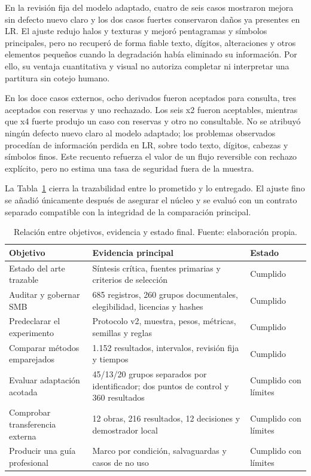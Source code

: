 En la revisión fija del modelo adaptado, cuatro de seis casos mostraron mejora sin defecto nuevo
claro y los dos casos fuertes conservaron daños ya presentes en LR. El ajuste redujo halos y
texturas y mejoró pentagramas y símbolos principales, pero no recuperó de forma fiable texto,
dígitos, alteraciones y otros elementos pequeños cuando la degradación había eliminado su
información. Por ello, su ventaja cuantitativa y visual no autoriza completar ni interpretar una
partitura sin cotejo humano.

En los doce casos externos, ocho derivados fueron aceptados para consulta, tres aceptados con
reservas y uno rechazado. Los seis x2 fueron aceptables, mientras que x4 fuerte produjo un caso con
reservas y otro no consultable. No se atribuyó ningún defecto nuevo claro al modelo adaptado; los
problemas observados procedían de información perdida en LR, sobre todo texto, dígitos, cabezas y
símbolos finos. Este recuento refuerza el valor de un flujo reversible con rechazo explícito, pero
no estima una tasa de seguridad fuera de la muestra.

La Tabla~\ref{tab:objective-evidence} cierra la trazabilidad entre lo prometido y lo entregado. El
ajuste fino se añadió únicamente después de asegurar el núcleo y se evaluó con un contrato separado
compatible con la integridad de la comparación principal.

\begin{table}[htbp]
  \centering
  \footnotesize
  \setlength{\tabcolsep}{3pt}
  \caption{Relación entre objetivos, evidencia y estado final. Fuente: elaboración propia.}
  \label{tab:objective-evidence}
  \begin{tabular}{p{}p{}p{}}
    \toprule
    Objetivo & Evidencia principal & Estado \\
    \midrule
    Estado del arte trazable & Síntesis crítica, fuentes primarias y criterios de selección & Cumplido \\
    Auditar y gobernar SMB & 685 registros, 260 grupos documentales, elegibilidad, licencias y hashes & Cumplido \\
    Predeclarar el experimento & Protocolo v2, muestra, pesos, métricas, semillas y reglas & Cumplido \\
    Comparar métodos emparejados & 1.152 resultados, intervalos, revisión fija y tiempos & Cumplido \\
    Evaluar adaptación acotada & 45/13/20 grupos separados por identificador; dos puntos de control y 360 resultados & Cumplido con límites \\
    Comprobar transferencia externa & 12 obras, 216 resultados, 12 decisiones y demostrador local & Cumplido con límites \\
    Producir una guía profesional & Marco por condición, salvaguardas y casos de no uso & Cumplido con límites \\
    \bottomrule
  \end{tabular}
\end{table}

